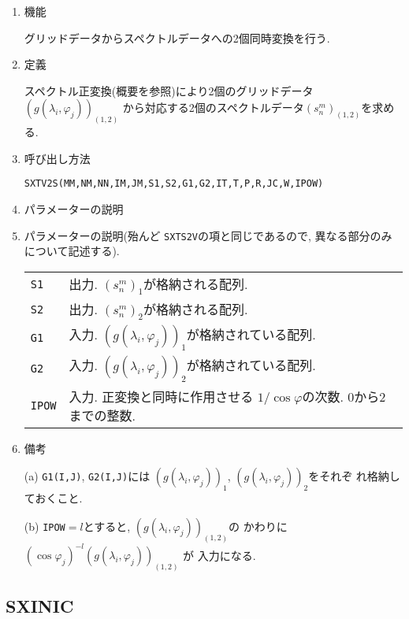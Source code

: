 \documentclass[a4j]{jsarticle}
\begin{document}
\begin{enumerate}

\item 機能 

グリッドデータからスペクトルデータへの2個同時変換を行う.

\item 定義

スペクトル正変換(概要を参照)により2個のグリッドデータ
$(g(\lambda_i,\varphi_j))_{(1,2)}$
から対応する2個のスペクトルデータ$(s^m_n)_{(1,2)}$を求める.

\item 呼び出し方法 

\texttt{SXTV2S(MM,NM,NN,IM,JM,S1,S2,G1,G2,IT,T,P,R,JC,W,IPOW)}
  
\item パラメーターの説明

\item パラメーターの説明(殆んど \texttt{SXTS2V}の項と同じであるので,
異なる部分のみについて記述する).
  

\begin{tabular}{ll}
\texttt{S1} & 出力. $(s^m_n)_1$が格納される配列.\\
\texttt{S2} & 出力. $(s^m_n)_2$が格納される配列.\\
\texttt{G1} & 入力. $(g(\lambda_i,\varphi_j))_1$が格納されている配列.\\
\texttt{G2} & 入力. $(g(\lambda_i,\varphi_j))_2$が格納されている配列.\\
\texttt{IPOW} & 入力. 正変換と同時に作用させる
                      $1/\cos\varphi$の次数. 0から2までの整数.
\end{tabular}

\item 備考

(a) \texttt{G1(I,J)}, \texttt{G2(I,J)}には
    $(g(\lambda_i,\varphi_j))_1$, $(g(\lambda_i,\varphi_j))_2$をそれぞ
  れ格納しておくこと.

(b) \texttt{IPOW}$=l$とすると, $(g(\lambda_i,\varphi_j))_{(1,2)}$の
    かわりに $(\cos\varphi_j)^{-l}(g(\lambda_i,\varphi_j))_{(1,2)}$ が
    入力になる.

\end{enumerate}


\subsection{SXINIC}
\end{document}
